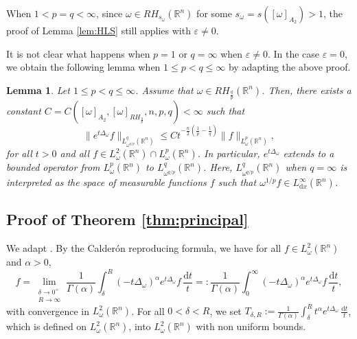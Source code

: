 \documentclass[12pt, letterpaper]{amsart}
\newtheorem{lem}[thm]{Lemma}
\theoremstyle{definition}
\theoremstyle{remark}
\numberwithin{equation}{section}
\begin{document}
When $1<p = q<\infty$, since $\omega \in RH_{s_\omega}(\mathbb{R}^n)$ for some $s_\omega = s([\omega]_{A_2}) > 1$, the proof of Lemma \ref{lem:HLS} still applies with $\varepsilon\ne 0$.

 It is  not clear what happens when $p=1 $ or  $q=\infty$  when $\varepsilon\ne 0$.    In the case $\varepsilon = 0$,  we obtain the following lemma when $1 \leq p < q \leq \infty$ by adapting the above proof.


\begin{lem}\label{lem:extrémités} 
    Let $1 \le p < q \le \infty$. Assume that $\omega \in RH_{\frac{q}{p}}(\mathbb{R}^n)$. Then, there exists a constant $C = C([ \omega  ]_{A_2},[ \omega  ]_{RH_{\frac{q}{p}}},n,p,q)<\infty$ such that 
    \begin{equation*}
        \| e^{t\Delta_\omega} f \|_{L^q_{{\omega}^{q/p}}(\mathbb{R}^n)} \leq C t^{-\frac{n}{2}(\frac{1}{p}-\frac{1}{q})} \|  f \|_{L^p_{\omega}(\mathbb{R}^n)},
    \end{equation*}
    for all $t>0$ and all $f\in L^2_\omega(\mathbb{R}^n) \cap  L^p_{\omega}(\mathbb{R}^n)$. In particular, $e^{t\Delta_\omega}$ extends to a bounded operator from $L^p_{\omega}(\mathbb{R}^n)$ to $L^q_{{\omega}^{q/p}}(\mathbb{R}^n)$. Here, ${L^q_{{\omega}^{q/p}}(\mathbb{R}^n)}$ when $q=\infty$ is interpreted as the space of measurable functions $f$ such that $\omega^{1/p} f \in L^\infty_{\mathrm{d}x}(\mathbb{R}^n)$.
\end{lem}



\subsection{Proof of Theorem \ref{thm:principal}}
    We adapt  \cite[Proposition 5.3]{auscher2007necessary}. By the Calder\'on reproducing formula, we have for all $f\in L^2_\omega(\mathbb{R}^n)$ and $\alpha>0$,  
    \begin{equation*}
                f=\lim_{\substack{\delta \to 0^+ \\ R \to \infty}}\frac{1}{\Gamma(\alpha)}\int_{\delta}^{R}(-t\Delta_\omega)^\alpha e^{t\Delta_\omega}f \, \frac{\mathrm{d}t}{t}=:\frac{1}{\Gamma(\alpha)}\int_{0}^{\infty}(-t\Delta_\omega)^\alpha e^{t\Delta_\omega}f \, \frac{\mathrm{d}t}{t},
    \end{equation*}
    with convergence in $L^2_\omega(\mathbb{R}^n)$. For all $0<\delta<R$, we set $T_{\delta,R}:=\frac{1}{\Gamma(\alpha)}\int_{\delta}^{R}t^{\alpha} e^{t\Delta_\omega} \, \frac{\mathrm{d}t}{t}$, which is defined on $L^2_\omega(\mathbb{R}^n)$, into $L^2_\omega(\mathbb{R}^n)$ with non uniform bounds.
    
\end{document}
